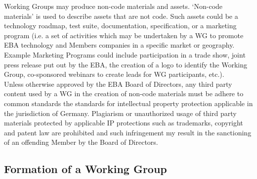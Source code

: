 \documentclass{article}
\begin{document}
Working Groups may produce non-code materials and assets.
 ‘Non-code materials’ is used to describe assets that are not code. 
Such assets could be a technology roadmap, test suite, documentation, specification, or a marketing program (i.e. a set of activities which may be undertaken by a WG to promote EBA technology and Members companies in a specific market or geography. 
Example Marketing Programs could include participation in a trade show, joint press release put out by the EBA, the creation of a logo to identify the Working Group, co-sponsored webinars to create leads for WG participants, etc.). \\
Unless otherwise approved by the EBA Board of Directors, any third party content used by a WG in the creation of non-code materials must be adhere to common standards the standards for intellectual property protection applicable in the jurisdiction of Germany. 
Plagiarism or unauthorized usage of third party materials protected by applicable IP protections such as trademarks, copyright and patent law are prohibited and such infringement my result in the sanctioning of an offending Member by the Board of Directors.

\subsection{Formation of a Working Group}
\end{document}
